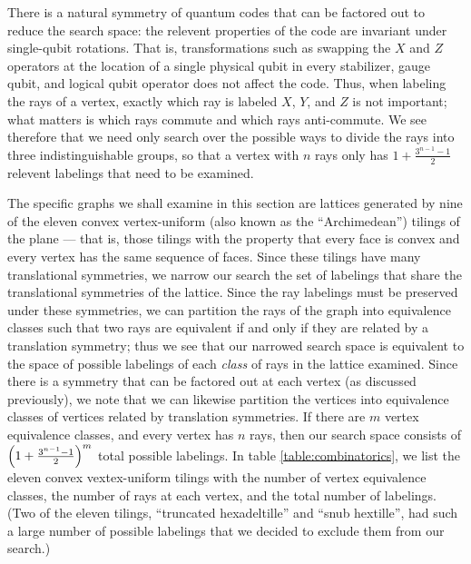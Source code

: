 \documentclass[twocolumn,showpacs,preprintnumbers,amsmath,amssymb,nofootinbib,pra,floatfix]{revtex4-1}
\begin{document}
There is a natural symmetry of quantum codes that can be factored out to reduce the search space:  the relevent properties of the code are invariant under single-qubit rotations.  That is, transformations such as swapping the $X$ and $Z$ operators at the location of a single physical qubit in every stabilizer, gauge qubit, and logical qubit operator does not affect the code.  Thus, when labeling the rays of a vertex, exactly which ray is labeled $X$, $Y$, and $Z$ is not important;  what matters is which rays commute and which rays anti-commute.  We see therefore that we need only search over the possible ways to divide the rays into three indistinguishable groups, so that a vertex with $n$ rays only has $1+\frac{3^{n-1}-1}{2}$ relevent labelings that need to be examined.

The specific graphs we shall examine in this section are lattices generated by nine of the eleven convex vertex-uniform (also known as the ``Archimedean'') tilings of the plane --- that is, those tilings with the property that every face is convex and every vertex has the same sequence of faces.  Since these tilings have many translational symmetries, we narrow our search the set of labelings that share the translational symmetries of the lattice.  Since the ray labelings must be preserved under these symmetries, we can partition the rays of the graph into equivalence classes such that two rays are equivalent if and only if they are related by a translation symmetry;  thus we see that our narrowed search space is equivalent to the space of possible labelings of each \emph{class} of rays in the lattice examined.  Since there is a symmetry that can be factored out at each vertex (as discussed previously), we note that we can likewise partition the vertices into equivalence classes of vertices related by translation symmetries.  If there are $m$ vertex equivalence classes, and every vertex has $n$ rays, then our search space consists of $\left(1+\frac{3^{n-1}-1}{2}\right)^m$ total possible labelings.  In table \ref{table:combinatorics}, we list the eleven convex vextex-uniform tilings with the number of vertex equivalence classes, the number of rays at each vertex, and the total number of labelings.  (Two of the eleven tilings, ``truncated hexadeltille'' and ``snub hextille'', had such a large number of possible labelings that we decided to exclude them from our search.)
\end{document}
